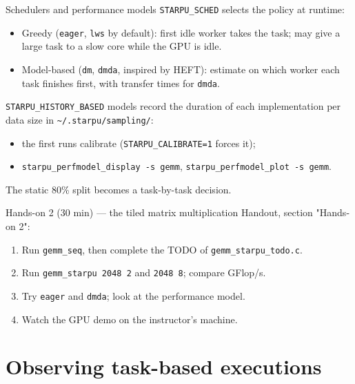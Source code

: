 \documentclass[presentation, aspectratio=169]{beamer}
\begin{document}
\begin{frame}[label={sec:org9b17d25},fragile]{Schedulers and performance models}
 \small
\texttt{STARPU\_SCHED} selects the policy at runtime:
\begin{itemize}
\item \alert{Greedy} (\texttt{eager}, \texttt{lws} by default): first idle worker takes the
task; may give a large task to a slow core while the GPU is idle.
\item \alert{Model-based} (\texttt{dm}, \texttt{dmda}, inspired by HEFT): estimate on which
worker each task finishes first, with transfer times for \texttt{dmda}.
\end{itemize}

\texttt{STARPU\_HISTORY\_BASED} models record the duration of each
implementation per data size in \texttt{\textasciitilde{}/.starpu/sampling/}:
\begin{itemize}
\item the first runs calibrate (\texttt{STARPU\_CALIBRATE=1} forces it);
\item \texttt{starpu\_perfmodel\_display -s gemm}, \texttt{starpu\_perfmodel\_plot -s gemm}.
\end{itemize}

The static 80\% split becomes a task-by-task decision.
\end{frame}
\begin{frame}[label={sec:org034cbc4},fragile]{Hands-on 2 (30 min) --- the tiled matrix multiplication}
 Handout, section "Hands-on 2":
\begin{enumerate}
\item Run \texttt{gemm\_seq}, then complete the TODO of \texttt{gemm\_starpu\_todo.c}.
\item Run \texttt{gemm\_starpu 2048 2} and \texttt{2048 8}; compare GFlop/s.
\item Try \texttt{eager} and \texttt{dmda}; look at the performance model.
\item Watch the GPU demo on the instructor's machine.
\end{enumerate}
\end{frame}
\section{Observing task-based executions}
\label{sec:orgb047b82}
\end{document}
